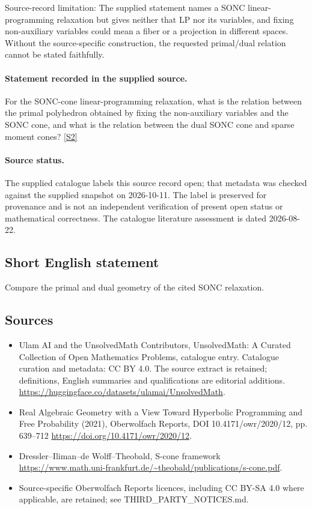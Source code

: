 \documentclass[11pt]{article}
\begin{document}
Source-record limitation: The supplied statement names a SONC linear-programming relaxation but gives neither that LP nor its variables, and fixing non-auxiliary variables could mean a fiber or a projection in different spaces. Without the source-specific construction, the requested primal/dual relation cannot be stated faithfully.
\paragraph{Statement recorded in the supplied source.}
For the SONC-cone linear-programming relaxation, what is the relation between the primal polyhedron obtained by fixing the non-auxiliary variables and the SONC cone, and what is the relation between the dual SONC cone and sparse moment cones? \href{https://doi.org/10.4171/owr/2020/12}{[S2]}
\paragraph{Source status.}
The supplied catalogue labels this source record open; that metadata was checked against the supplied snapshot on 2026-10-11. The label is preserved for provenance and is not an independent verification of present open status or mathematical correctness. The catalogue literature assessment is dated 2026-08-22.
\subsection{Short English statement}
Compare the primal and dual geometry of the cited SONC relaxation.
\subsection{Sources}
\begin{itemize}
\item[S1] Ulam AI and the UnsolvedMath Contributors, UnsolvedMath: A Curated Collection of Open Mathematics Problems, catalogue entry. Catalogue curation and metadata: CC BY 4.0. The source extract is retained; definitions, English summaries and qualifications are editorial additions.
\url{https://huggingface.co/datasets/ulamai/UnsolvedMath}.
\item[S2] Real Algebraic Geometry with a View Toward Hyperbolic Programming and Free Probability (2021), Oberwolfach Reports, DOI 10.4171/owr/2020/12, pp. 639--712
\url{https://doi.org/10.4171/owr/2020/12}.
\item[S3] Dressler--Iliman--de Wolff--Theobald, S-cone framework
\url{https://www.math.uni-frankfurt.de/~theobald/publications/s-cone.pdf}.
\item Source-specific Oberwolfach Reports licences, including CC BY-SA 4.0 where applicable, are retained; see THIRD\_PARTY\_NOTICES.md.
\end{itemize}
\end{document}

